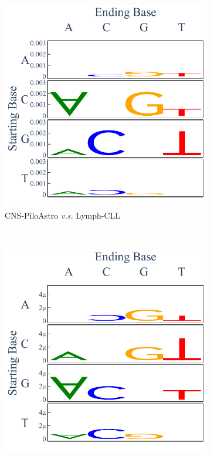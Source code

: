 \begin{figure}[ht!]
    \begin{subfigure}{.5\textwidth}
    \includegraphics[scale=0.7]{graphics/spectra_CNS-PiloAstro_Lymph-CLL.pdf}
    \caption{CNS-PiloAstro \textit{v.s.} Lymph-CLL}
    \label{fig:spectra_piloastro_cll}
    \end{subfigure}
    ~
    \begin{subfigure}{.5\textwidth}
    \includegraphics[scale=0.7]{graphics/spectra_Lymph-BNHL_Lymph-CLL.pdf}

\end{subfigure}
\end{figure}
